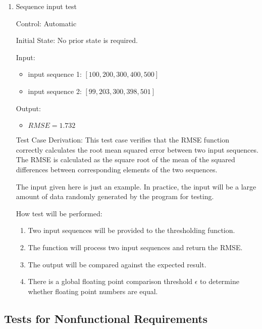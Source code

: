 \documentclass[12pt, titlepage]{article}
\begin{document}
\begin{enumerate}

  \item{Sequence input test\\}
  
  Control: Automatic
            
  Initial State: No prior state is required.
            
  Input:
  \begin{itemize}
    \item input sequence 1: $[100, 200, 300, 400, 500]$
    \item input sequence 2: $[99, 203, 300, 398, 501]$
  \end{itemize}
  
  Output:
  \begin{itemize}
    \item $RMSE = 1.732$
  \end{itemize}
  
  Test Case Derivation: This test case verifies that the RMSE function correctly
  calculates the root mean squared error between two input sequences.  The RMSE
  is calculated as the square root of the mean of the squared differences
  between corresponding elements of the two sequences.

  The input given here is just an example.  In practice, the input will be a
  large amount of data randomly generated by the program for testing.
            
  How test will be performed: 
  \begin{enumerate}
    \item Two input sequences will be provided to the thresholding function.
    \item The function will process two input sequences and return the RMSE.
    \item The output will be compared against the expected result.
    \item There is a global floating point comparison threshold $\epsilon$ to
    determine whether floating point numbers are equal.
  \end{enumerate}

\end{enumerate}

\subsection{Tests for Nonfunctional Requirements}

\end{document}
